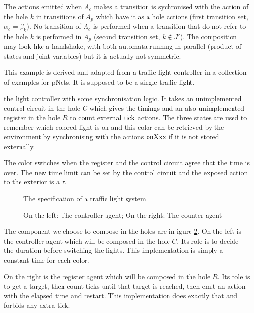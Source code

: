 \documentclass{article}
\begin{document}
The actions emitted when \(A_c\) makes a transition is sychronised with the action of the hole \(k\) in transitions of \(A_p\) which have it as a hole actions (first transition set, \(\alpha_c = \beta_k\)).
No transition of \(A_c\) is performed when a transition that do not refer to the hole \(k\) is performed in \(A_p\) (second transition set, \(k \notin J'\)).
The composition may look like a handshake, with both automata running in parallel (product of states and joint variables) but it is actually not symmetric.
\begin{exi}
This example is derived and adapted from a traffic light controller in a collection of examples for pNets.
It is supposed to be a single traffic light.

 the light controller with some synchronisation logic.
It  takes an unimplemented control circuit in the hole \(C\) which gives the timings and an also unimplemented register in the hole \(R\) to count external \(\mathrm{tick}\) actions.
The three states are used to remember which colored light is on and this color can be retrieved by the environment by synchronising with the actions \(\mathrm{onXxx}\) if it is not stored externally.

The color switches when the register and the control circuit agree that the time is over.
The new time limit can be set by the control circuit and the exposed action to the exterior is a \(\tau\).

\begin{figure}
\centering

\caption{The specification of a traffic light system}
\label{fig:tls}
\end{figure}
\begin{figure}
\centering

\vrule

\caption{On the left: The controller agent; On the right: The counter agent}
\label{fig:tlh}
\end{figure}
The component we choose to compose in the holes are in igure \ref{fig:tlh}.
On the left is the controller agent which will be composed in the hole \(C\).
Its role is to decide the duration before switching the lights.
This implementation is simply a constant time for each color.

On the right is the register agent which will be composed in the hole \(R\).
Its role is to get a target, then count ticks until that target is reached, then emit an action with the elapsed time and restart.
This implementation does exactly that and forbids any extra tick.


\end{exi}
\end{document}
